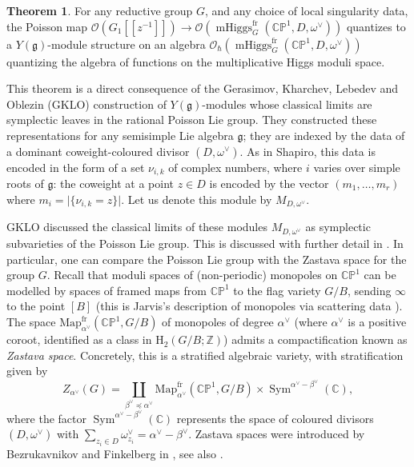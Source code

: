 \documentclass[11pt, oneside, reqno]{amsart}
\theoremstyle{definition} \newtheorem{definition}{Definition}[section]
\newtheorem{theorem}[definition]{Theorem}
\theoremstyle{definition} \newtheorem{remark}[definition]{Remark}
\theoremstyle{definition} \newtheorem{remarks}[definition]{Remarks}
\theoremstyle{definition} \newtheorem{question}[definition]{Question}
\theoremstyle{definition} \newtheorem*{note}{Note}
\theoremstyle{definition} \newtheorem{example}[definition]{Example}
\theoremstyle{definition} \newtheorem{examples}[definition]{Examples}
\renewcommand{\gg}{\mathfrak{g}}
\newcommand{\bb}[1]{\mathbb{#1}}
\newcommand{\mr}[1]{\mathrm{#1}}
\newcommand{\CC}{\mathbb{C}}
\newcommand{\OO}{\mathcal{O}}
\newcommand{\ZZ}{\mathbb{Z}}
\DeclareMathOperator{\sym}{Sym}
\DeclareMathOperator{\mhiggs}{mHiggs}
\newcommand{\fr}{\mathrm{fr}}
\begin{document}
\begin{theorem}
For any reductive group $G$, and any choice of local singularity data, the Poisson map $\OO(G_1[[z^{-1}]]) \to \OO(\mhiggs^\fr_G(\bb{CP}^1,D,\omega^\vee))$ quantizes to a $Y(\gg)$-module structure on an algebra $\OO_\hbar(\mhiggs^\fr_G(\bb{CP}^1,D,\omega^\vee))$ quantizing the algebra of functions on the multiplicative Higgs moduli space.  
\end{theorem}

This theorem is a direct consequence of the Gerasimov, Kharchev, Lebedev and Oblezin (GKLO) construction of $Y(\gg)$-modules whose classical limits are symplectic leaves in the rational Poisson Lie group.  They constructed these representations for any semisimple Lie algebra $\gg$; they are indexed by the data of a dominant coweight-coloured divisor $(D, \omega^\vee)$.  As in Shapiro, this data is encoded in the form of a set $\nu_{i,k}$ of complex numbers, where $i$ varies over simple roots of $\gg$: the coweight at a point $z \in D$ is encoded by the vector $(m_1, \ldots, m_r)$ where $m_i = \lvert\{\nu_{i,k} = z\}\rvert$.  Let us denote this module by $M_{D,\omega^\vee}$.

GKLO discussed the classical limits of these modules $M_{D,\omega^\vee}$ as symplectic subvarieties of the Poisson Lie group.  This is discussed with further detail in \cite[Section 4]{Shapiro}.  In particular, one can compare the Poisson Lie group with the Zastava space for the group $G$.  Recall that  moduli spaces of (non-periodic) monopoles on $\bb{CP}^1$ can be modelled by spaces of framed maps from $\bb{CP}^1$ to the flag variety $G/B$, sending $\infty$ to the point $[B]$ (this is Jarvis's description of monopoles via scattering data \cite{Jarvis}).  The space $\mr{Map}_{\alpha^\vee}^\fr(\bb{CP}^1, G/B)$ of monopoles of degree $\alpha^\vee$ (where $\alpha^\vee$ is a positive coroot, identified as a class in $\mr H_2(G/B;\ZZ)$) admits a compactification known as \emph{Zastava space}.  Concretely, this is a stratified algebraic variety, with stratification given by
\[Z_{\alpha^\vee}(G) = \coprod_{\beta^\vee \preceq \alpha^\vee} \mr{Map}_{\alpha^\vee}^\fr(\bb{CP}^1, G/B) \times \sym^{\alpha^\vee - \beta^\vee}(\CC),\]
where the factor $\sym^{\alpha^\vee - \beta^\vee}(\CC)$ represents the space of coloured divisors $(D, \omega^\vee)$ with $\sum_{z_i \in D} \omega^\vee_{z_i} = \alpha^\vee - \beta^\vee$.  Zastava spaces were introduced by Bezrukavnikov and Finkelberg in \cite{BezrukavnikovFinkelbergI}, see also \cite{BravermanICM}.
\end{document}
